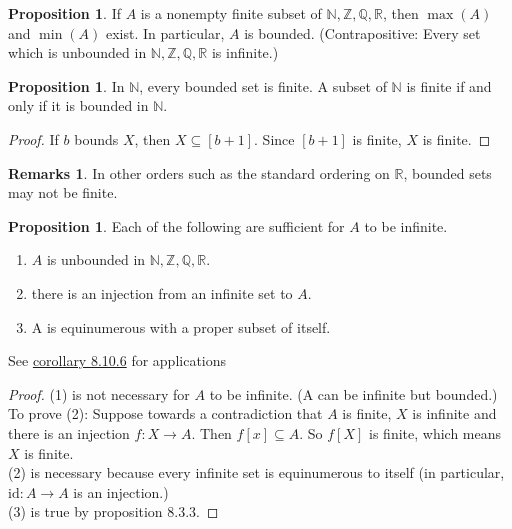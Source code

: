 \documentclass[14pt]{article}
\theoremstyle{definition}
\newtheorem*{remark}{Remarks}
\newtheorem{proposition}[definition]{Proposition}
\newcommand{\fun}[3]{#1\colon #2\rightarrow#3}
\newcommand{\bb}[1]{\mathbb{#1}}
\begin{document}
\begin{proposition}
    If $A$ is a nonempty finite subset of  $\bb{N}, \bb{Z}, \bb{Q},\bb{R}$, then $\max(A)$ and $\min(A)$ exist.
    In particular, $A$ is bounded. (Contrapositive: Every set which is unbounded in $\bb{N}, \bb{Z}, \bb{Q},\bb{R}$ is infinite.)
\end{proposition}

\vspace{2mm}

\begin{proposition}
    In $\bb{N}$, every bounded set is finite. A subset of $\bb{N}$ is finite if and only if 
    it is bounded in $\bb{N}$.
\end{proposition}
\begin{proof}
    If $b$ bounds $X$, then $X\subseteq [b+1]$. Since $[b+1]$ is finite, $X$ is finite.
\end{proof}
\begin{remark}
    In other orders such as the standard ordering on $\bb{R}$, bounded sets may not be finite.
\end{remark}

\vspace{2mm}

\hypertarget{proposition 8.5.4}{\begin{proposition}
    Each of the following are sufficient for $A$ to be infinite.
    \begin{enumerate}
        \item $A$ is unbounded in $\bb{N}, \bb{Z}, \bb{Q},\bb{R}$.
        \item there is an injection from an infinite set to $A$.
        \item A is equinumerous with a proper subset of itself.
    \end{enumerate}
    See \hyperlink{Corollary 8.10.6}{corollary 8.10.6} for applications
    \end{proposition} }

\begin{proof}
    (1) is not necessary for $A$ to be infinite.  (A can be infinite but bounded.)\\
    To prove (2): Suppose towards a contradiction that $A$ is finite, $X$ is infinite and there is 
    an injection $\fun{f}{X}{A}$. Then $f[x]\subseteq A$. So $f[X]$ is finite, which means $X$ is finite.\\
    (2) is necessary because every infinite set is equinumerous to itself (in particular,  $\fun{\mathrm{id}}{A}{A}$ is an injection.)\\
    (3) is true by proposition 8.3.3.
\end{proof}
\end{document}

